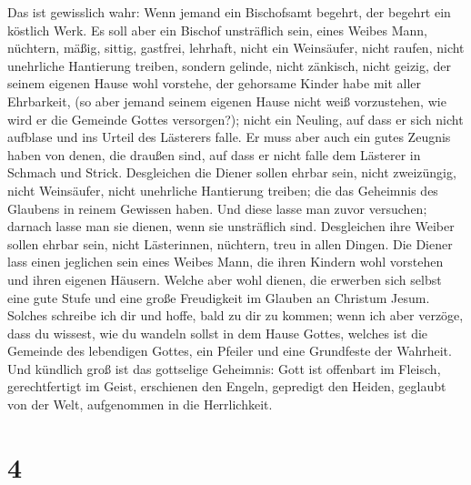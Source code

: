  Das ist gewisslich wahr: Wenn jemand ein Bischofsamt
begehrt, der begehrt ein köstlich Werk.  Es soll aber ein
Bischof unsträflich sein, eines Weibes Mann, nüchtern, mäßig, sittig,
gastfrei, lehrhaft,  nicht ein Weinsäufer, nicht raufen,
nicht unehrliche Hantierung treiben, sondern gelinde, nicht zänkisch,
nicht geizig,  der seinem eigenen Hause wohl vorstehe, der
gehorsame Kinder habe mit aller Ehrbarkeit,  (so aber
jemand seinem eigenen Hause nicht weiß vorzustehen, wie wird er die
Gemeinde Gottes versorgen?);  nicht ein Neuling, auf dass
er sich nicht aufblase und ins Urteil des Lästerers falle.
 Er muss aber auch ein gutes Zeugnis haben von denen, die
draußen sind, auf dass er nicht falle dem Lästerer in Schmach und
Strick.  Desgleichen die Diener sollen ehrbar sein, nicht
zweizüngig, nicht Weinsäufer, nicht unehrliche Hantierung treiben;
 die das Geheimnis des Glaubens in reinem Gewissen haben.
 Und diese lasse man zuvor versuchen; darnach lasse man
sie dienen, wenn sie unsträflich sind.  Desgleichen ihre
Weiber sollen ehrbar sein, nicht Lästerinnen, nüchtern, treu in allen
Dingen.  Die Diener lass einen jeglichen sein eines
Weibes Mann, die ihren Kindern wohl vorstehen und ihren eigenen Häusern.
 Welche aber wohl dienen, die erwerben sich selbst eine
gute Stufe und eine große Freudigkeit im Glauben an Christum Jesum.
 Solches schreibe ich dir und hoffe, bald zu dir zu
kommen;  wenn ich aber verzöge, dass du wissest, wie du
wandeln sollst in dem Hause Gottes, welches ist die Gemeinde des
lebendigen Gottes, ein Pfeiler und eine Grundfeste der Wahrheit.
 Und kündlich groß ist das gottselige Geheimnis: Gott ist
offenbart im Fleisch, gerechtfertigt im Geist, erschienen den Engeln,
gepredigt den Heiden, geglaubt von der Welt, aufgenommen in die
Herrlichkeit.

\hypertarget{section-3}{%
\section{4}\label{section-3}}

